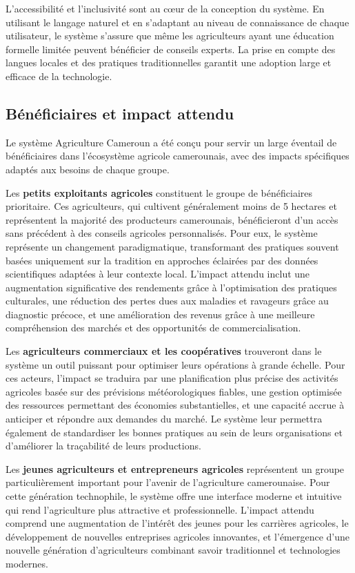L'accessibilité et l'inclusivité sont au cœur de la conception du système. En utilisant le langage naturel et en s'adaptant au niveau de connaissance de chaque utilisateur, le système s'assure que même les agriculteurs ayant une éducation formelle limitée peuvent bénéficier de conseils experts. La prise en compte des langues locales et des pratiques traditionnelles garantit une adoption large et efficace de la technologie.

\subsection{Bénéficiaires et impact attendu}

Le système Agriculture Cameroun a été conçu pour servir un large éventail de bénéficiaires dans l'écosystème agricole camerounais, avec des impacts spécifiques adaptés aux besoins de chaque groupe.

Les \textbf{petits exploitants agricoles} constituent le groupe de bénéficiaires prioritaire. Ces agriculteurs, qui cultivent généralement moins de 5 hectares et représentent la majorité des producteurs camerounais, bénéficieront d'un accès sans précédent à des conseils agricoles personnalisés. Pour eux, le système représente un changement paradigmatique, transformant des pratiques souvent basées uniquement sur la tradition en approches éclairées par des données scientifiques adaptées à leur contexte local. L'impact attendu inclut une augmentation significative des rendements grâce à l'optimisation des pratiques culturales, une réduction des pertes dues aux maladies et ravageurs grâce au diagnostic précoce, et une amélioration des revenus grâce à une meilleure compréhension des marchés et des opportunités de commercialisation.

Les \textbf{agriculteurs commerciaux et les coopératives} trouveront dans le système un outil puissant pour optimiser leurs opérations à grande échelle. Pour ces acteurs, l'impact se traduira par une planification plus précise des activités agricoles basée sur des prévisions météorologiques fiables, une gestion optimisée des ressources permettant des économies substantielles, et une capacité accrue à anticiper et répondre aux demandes du marché. Le système leur permettra également de standardiser les bonnes pratiques au sein de leurs organisations et d'améliorer la traçabilité de leurs productions.

Les \textbf{jeunes agriculteurs et entrepreneurs agricoles} représentent un groupe particulièrement important pour l'avenir de l'agriculture camerounaise. Pour cette génération technophile, le système offre une interface moderne et intuitive qui rend l'agriculture plus attractive et professionnelle. L'impact attendu comprend une augmentation de l'intérêt des jeunes pour les carrières agricoles, le développement de nouvelles entreprises agricoles innovantes, et l'émergence d'une nouvelle génération d'agriculteurs combinant savoir traditionnel et technologies modernes.


